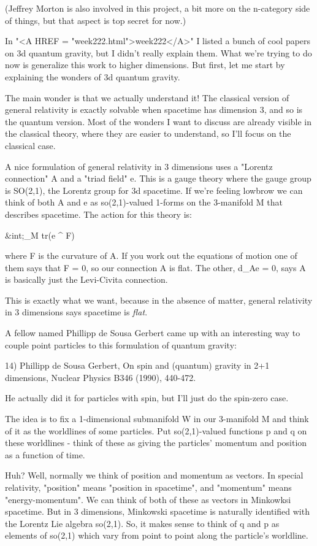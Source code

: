 (Jeffrey Morton is also involved in this project, a bit more on the 
n-category side of things, but that aspect is top secret for now.)

In "<A HREF = "week222.html">week222</A>" I listed a bunch of cool papers on 3d quantum gravity,
but I didn't really explain them.  What we're trying to do now is 
generalize this work to higher dimensions.  But first, let me start
by explaining the wonders of 3d quantum gravity.  

The main wonder is that we actually understand it!  The classical
version of general relativity is exactly solvable when spacetime has
dimension 3, and so is the quantum version.  Most of the wonders I 
want to discuss are already visible in the classical theory, where 
they are easier to understand, so I'll focus on the classical case.

A nice formulation of general relativity in 3 dimensions uses a
"Lorentz connection" A and a "triad field" e.  This is a gauge theory
where the gauge group is SO(2,1), the Lorentz group for 3d spacetime.
If we're feeling lowbrow we can think of both A and e as so(2,1)-valued 
1-forms on the 3-manifold M that describes spacetime.  The action for 
this theory is:

&int;_{M}  tr(e ^ F)

where F is the curvature of A.  If you work out the equations of
motion one of them says that F = 0, so our connection A is flat.  The
other, d_{A}e = 0, says A is basically just the
Levi-Civita connection.

This is exactly what we want, because in the absence of matter, 
general relativity in 3 dimensions says spacetime is \emph{flat}.

A fellow named Phillipp de Sousa Gerbert came up with an interesting
way to couple point particles to this formulation of quantum gravity:

14) Phillipp de Sousa Gerbert, On spin and (quantum) gravity in 2+1
dimensions, Nuclear Physics B346 (1990), 440-472.

He actually did it for particles with spin, but I'll just do the 
spin-zero case.  

The idea is to fix a 1-dimensional submanifold W in our 3-manifold M 
and think of it as the worldlines of some particles.  Put so(2,1)-valued 
functions p and q on these worldlines - think of these as giving the 
particles' momentum and position as a function of time.  

Huh?  Well, normally we think of position and momentum as vectors.  
In special relativity, "position" means "position in spacetime",
and "momentum" means "energy-momentum".  We can think of both of
these as vectors in Minkowksi spacetime.  But in 3 dimensions, 
Minkowski spacetime is naturally identified with the Lorentz Lie 
algebra so(2,1).  So, it makes sense to think of q and p as elements
of so(2,1) which vary from point to point along the particle's 
worldline.

